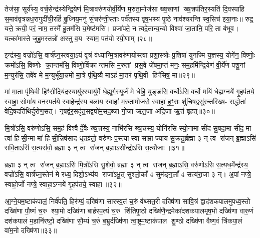 तेज॑सा॒ सूर्य॑स्य॒ वर्च॒सेन्द्र॑स्येन्द्रि॒येण॑ मि॒त्रावरु॑णयोर्वी॒र्ये॑ण म॒रुता॒मोज॑सा ख्ष॒त्त्राणां ख्ष॒त्त्रप॑तिर॒स्यति॑ दि॒वस्पा॑हि स॒माव॑वृत्रन्नध॒रागुदी॑ची॒रहिं॑ बु॒ध्निय॒मनु॑ सं॒चर॑न्ती॒स्ताः पर्व॑तस्य वृष॒भस्य॑ पृ॒ष्ठे नाव॑श्चरन्ति स्व॒सिच॑ इया॒नाः॥ रुद्र॒ यत्ते॒ क्रयी॒ परं॒ नाम॒ तस्मै॑ हु॒तम॑सि य॒मेष्ट॑मसि। प्रजा॑पते॒ न त्वदे॒तान्य॒न्यो विश्वा॑ जा॒तानि॒ परि॒ ता ब॑भूव। यत्का॑मास्ते जुहु॒मस्तन्नो॑ अस्तु व॒य स्या॑म॒ पत॑यो रयी॒णाम्॥२८॥

{\anuvakamend[{अ॒ग्नेस्तैका॑दश च॥14॥}]}

इन्द्र॑स्य॒ वज्रो॑ऽसि॒ वार्त्र॑घ्न॒स्त्वया॒ऽयं वृ॒त्रं व॑ध्यान्मि॒त्रावरु॑णयोस्त्वा प्रशा॒स्त्रोः प्र॒शिषा॑ युनज्मि य॒ज्ञस्य॒ योगे॑न॒ विष्णोः॒ क्रमो॑ऽसि॒ विष्णोः क्रा॒न्तम॑सि॒ विष्णो॒र्विक्रान्तमसि म॒रुतां प्रस॒वे जे॑षमा॒प्तं मनः॒ सम॒हमि॑न्द्रि॒येण॑ वी॒र्ये॑ण पशू॒नां म॒न्युर॑सि॒ तवे॑व मे म॒न्युर्भू॑या॒न्नमो॑ मा॒त्रे पृ॑थि॒व्यै माऽहं मा॒तरं॑ पृथि॒वी हिꣳ॑सिषं॒ मा॥२९॥

मां मा॒ता पृ॑थि॒वी हिꣳ॑सी॒दिय॑द॒स्यायु॑र॒स्यायु॑र्मे धे॒ह्यूर्ग॒स्यूर्जं॑ मे धेहि॒ युङ्ङ॑सि॒ वर्चो॑ऽसि॒ वर्चो॒ मयि॑ धेह्य॒ग्नये॑ गृ॒हप॑तये॒ स्वाहा॒ सोमा॑य॒ वन॒स्पत॑ये॒ स्वाहेन्द्र॑स्य॒ बला॑य॒ स्वाहा॑ म॒रुता॒मोज॑से॒ स्वाहा॑ ह॒ꣳ॒सः शु॑चि॒षद्वसु॑रन्तरिख्ष॒- सद्धोता॑ वेदि॒षदति॑थिर्दुरोण॒सत्। नृ॒षद्व॑र॒सदृ॑त॒सद्व्यो॑म॒सद॒ब्जा गो॒जा ऋ॑त॒जा अ॑द्रि॒जा ऋ॒तं बृ॒हत्॥३०॥

{\anuvakamend[{हि॒ꣳ॒सि॒षं॒ मर्त॒जास्त्रीणि॑ च॥15॥}]}

मि॒त्रो॑ऽसि॒ वरु॑णोऽसि॒ सम॒हं विश्वैर्दे॒वैः ख्ष॒त्त्रस्य॒ नाभि॑रसि ख्ष॒त्त्रस्य॒ योनि॑रसि स्यो॒नामा सी॑द सु॒षदा॒मा सी॑द॒ मा त्वा॑ हिसी॒न्मा मा॑ हिसी॒न्निष॑साद धृ॒तव्र॑तो॒ वरु॑णः प॒स्त्यास्वा साम्राज्याय सु॒क्रतु॒र्ब्रह्मा ३ न् त्व रा॑जन् ब्र॒ह्माऽसि॑ सवि॒ताऽसि॑ स॒त्यस॑वो॒ ब्रह्मा ३ न् त्व रा॑जन् ब्र॒ह्माऽसीन्द्रो॑ऽसि स॒त्यौजाः॥३१॥

ब्रह्मा ३ न् त्व रा॑जन् ब्र॒ह्माऽसि॑ मि॒त्रो॑ऽसि सु॒शेवो॒ ब्रह्मा ३ न् त्व रा॑जन् ब्र॒ह्माऽसि॒ वरु॑णोऽसि स॒त्यध॒र्मेन्द्र॑स्य॒ वज्रो॑ऽसि॒ वार्त्र॑घ्न॒स्तेन॑ मे रध्य॒ दिशो॒ऽभ्य॑य राजा॑ऽभू॒त् सुश्लो॒काँ 4 सुम॑ङ्ग॒लाँ 4 सत्य॑रा॒जा ३ न्। अ॒पां नप्त्रे॒ स्वाहो॒र्जो नप्त्रे॒ स्वाहा॒ऽग्नये॑ गृ॒हप॑तये॒ स्वाहा॥३२॥

{\anuvakamend[{स॒त्यौजाश्चत्वारि॒ꣳ॒शच्च॑॥16॥}]}

आ॒ग्ने॒यम॒ष्टाक॑पालं॒ निर्व॑पति॒ हिर॑ण्यं॒ दख्षि॑णा सारस्व॒तं च॒रुं व॑थ्सत॒री दख्षि॑णा सावि॒त्रं द्वाद॑शकपालमुपध्व॒स्तो दख्षि॑णा पौ॒ष्णं च॒रु श्या॒मो दख्षि॑णा बार्\mbox{}हस्प॒त्यं च॒रु शि॑तिपृ॒ष्ठो दख्षि॑णै॒न्द्रमेका॑दशकपालमृष॒भो दख्षि॑णा वारु॒णं दश॑कपालं म॒हानि॑रष्टो॒ दख्षि॑णा सौ॒म्यं च॒रुं ब॒भ्रुर्दख्षि॑णा त्वा॒ष्ट्रम॒ष्टाक॑पाल शु॒ण्ठो दख्षि॑णा वैष्ण॒वं त्रि॑कपा॒लं वा॑म॒नो दख्षि॑णा॥३३॥


